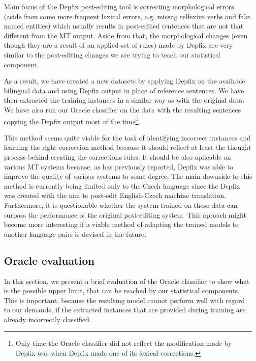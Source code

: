 Main focus of the Depfix post-editing tool is correcting morphological errors (aside from some more
frequent lexical errors, e.g. missng relfexive verbs and fake named entities) which usually 
results in post-edited sentences that are not that different from the MT output. Aside from that,
the morphological changes (even though they are a result of an applied set of rules) made
by Depfix are very similar to the post-editing changes we are trying to teach our statistical component.

As a result, we have created a new datasets by applying Depfix on the available bilingual data and
using Depfix output in place of reference sentences. We have then extracted the training instances in a
similar way as with the original data. We have also run our Oracle classifier on the data with
the resulting sentences copying the Depfix output most of the time\footnote{Only time the Oracle classifier
did not reflect the modification made by Depfix was when Depfix made one of its lexical corrections.}.

This method seems quite viable for the task of identifying incorrect instances and learning the
right correction method because it should reflect at least the thought process behind creating the corrections rules.
It should be also aplicable on various MT systems because, as \citet{depfix:2014} has
previously reported, Depfix was able to improve the quality of various systems to some degree.
The main downside to this method is currently being
limited only to the Czech language since the Depfix was
created with the aim to post-edit English-Czech machine translation.
Furthermore, it is questionable whether the system trained on these data can surpass the performance
of the original post-editing system. 
This aproach might become more interesting if a viable method of adapting the trained models
to another language pairs is devised in the future.

\subsection{Oracle evaluation}

In this section, we present a brief evaluation of the Oracle classifier to show
what is the possible upper limit, that can be reached by our statistical components. This is
important, because the resulting model cannot perform well with regard to our demands, if the extracted
instances that are provided during training are already incorrectly classified.

